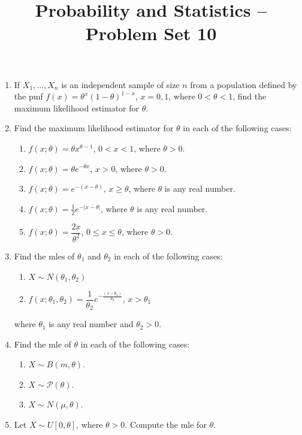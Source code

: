 \documentclass[svgnames]{amsart}
\title[]{Probability and Statistics -- Problem Set 10}
\begin{document}
\maketitle
\begin{enumerate}[leftmargin=*, itemsep=2mm]
\item If $X_1, \ldots, X_n$ is an independent sample of size $n$ from a population defined by the pmf $f(x) = \theta^x (1 - \theta)^{1 - x}$, $x = 0, 1$, where $0 < \theta < 1$, find the maximum likelihood estimator for $\theta$.

\item Find the maximum likelihood estimator for $\theta$ in each of the following cases:
\begin{enumerate}
\item $f(x; \theta) = \theta x^{\theta - 1}$, $0 < x < 1$, where $\theta > 0$.
\item $f(x; \theta) = \theta e^{-\theta x}$, $x > 0$, where $\theta > 0$.
\item $f(x; \theta) = e^{-(x - \theta)}$, $x \ge \theta$, where $\theta$ is any real number.
\item $f(x; \theta) = \frac 1 2 e^{-|x - \theta|}$, where $\theta$ is any real number.
\item $f(x; \theta) = \dfrac {2x} {\theta^2}$, $0 \le x \le \theta$, where $\theta > 0$.
\end{enumerate}

\item Find the mles of $\theta_1$ and $\theta_2$ in each of the following cases:
\begin{enumerate}
\item $X \sim N(\theta_1, \theta_2)$
\item $f(x; \theta_1, \theta_2) = \dfrac{1}{\theta_2} e^{- \frac{(x - \theta_1)}{\theta_2}}$, $x > \theta_1$
\end{enumerate}
where $\theta_1$ is any real number and $\theta_2 > 0$.

\item Find the mle of $\theta$ in each of the following cases:
\begin{enumerate}
\item  $X \sim B(m, \theta)$.
\item $X \sim \mathcal P(\theta)$.
\item $X \sim N(\mu, \theta)$.
\end{enumerate}

\item Let $X \sim U[0, \theta]$, where $\theta > 0$. Compute the mle for $\theta$.


\end{enumerate}
\end{document}
